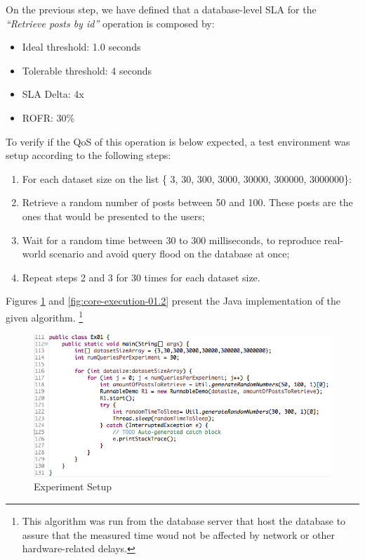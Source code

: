 On the previous step, we have defined that a database-level SLA for the \textit{``Retrieve posts by id''} operation is composed by: 

\begin{itemize}
	\item{Ideal threshold: 1.0 seconds}
	\item{Tolerable threshold: 4 seconds}
	\item{SLA Delta: 4x}
	\item{ROFR: 30\%}
\end{itemize}

To verify if the QoS of this operation is below expected, a test environment was setup according to the following steps: 

\begin{enumerate}
\item{For each dataset size on the list \{ 3, 30, 300, 3000, 30000, 300000, 3000000\}: }
\item{Retrieve a random number of posts between 50 and 100. These posts are the ones that would be presented to the users;}
\item{Wait for a random time between 30 to 300 milliseconds, to reproduce real-world scenario and avoid	query flood on the database at once;}
\item{Repeat steps 2 and 3 for 30 times for each dataset size.}
\end{enumerate}


Figures \ref{fig:core-execution-01} and \ref{fig:core-execution-01.2} present the Java implementation of the given algorithm. \footnote{This algorithm was run from the database server that host the database to assure that the measured time woud not be affected by network or other hardware-related delays.}


\begin{figure}[ht!]
\centering
\includegraphics[width=120mm]{Imagens/core-execution-01-1.png}
\caption{Experiment Setup \label{fig:core-execution-01}}
\end{figure}

